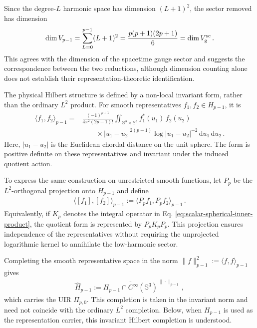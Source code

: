 \documentclass{SciPost}
\begin{document}
Since the degree-$L$ harmonic space has dimension $(L+1)^2$, the sector removed has dimension
\begin{align}
    \dim V_{p-1}
    =
    \sum_{L=0}^{p-1}(L+1)^2
    =
    \frac{p(p+1)(2p+1)}{6}
    =
    \dim V_{\rm g}^{\rm sc} \,.
\end{align}
This agrees with the dimension of the spacetime gauge sector and suggests the correspondence between the two reductions, although dimension counting alone does not establish their representation-theoretic identification.

The physical Hilbert structure is defined by a non-local invariant form, rather than the ordinary $L^2$ product. For smooth representatives $f_1,f_2\in H_{p-1}$, it is
\begin{align}\label{eq:scalar-spherical-inner-product}
    \langle f_1,f_2\rangle_{p-1}
    ={}&
    \frac{(-1)^{p+1}}{4\pi^2(2p-1)!}
    \iint_{\mathbb S^3\times\mathbb S^3}
    f_1^\ast(u_1)\,f^{}_2(u_2)
    \nonumber\\[3pt] 
    &\qquad\times
    |u_1-u_2|^{2(p-1)}
    \log|u_1-u_2|^{-2}
    \,\mathrm{d}u_1\,\mathrm{d}u_2 \,.
\end{align}
Here, $|u_1-u_2|$ is the Euclidean chordal distance on the unit sphere. The form is positive definite on these representatives and invariant under the induced quotient action.

To express the same construction on unrestricted smooth functions, let $P_p$ be the $L^2$-orthogonal projection onto $H_{p-1}$ and define
\begin{align}
    \langle[f_1],[f_2]\rangle_{p-1}
    :=
    \langle P_pf_1,P_pf_2\rangle_{p-1} \,.
\end{align}
Equivalently, if $K_p$ denotes the integral operator in Eq. \eqref{eq:scalar-spherical-inner-product}, the quotient form is represented by $P_pK_pP_p$. This projection ensures independence of the representatives without requiring the unprojected logarithmic kernel to annihilate the low-harmonic sector.

Completing the smooth representative space in the norm $\|f\|_{p-1}^2:=\langle f,f\rangle_{p-1}$ gives
\begin{align}
    \widehat H_{p-1}
    :=
    \overline{
        H_{p-1}\cap C^\infty(\mathbb S^3)
    }^{\,\|\cdot\|_{p-1}} \,,
\end{align}
which carries the UIR $\Pi_{p,0}$. This completion is taken in the invariant norm and need not coincide with the ordinary $L^2$ completion. Below, when $H_{p-1}$ is used as the representation carrier, this invariant Hilbert completion is understood.
\end{document}

